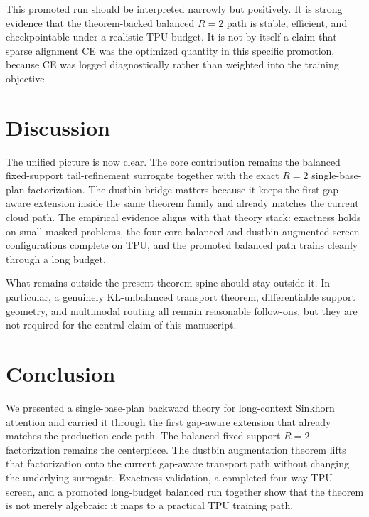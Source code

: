 \documentclass{article}
\begin{document}
This promoted run should be interpreted narrowly but positively. It is strong evidence that the theorem-backed balanced $R=2$ path is stable, efficient, and checkpointable under a realistic TPU budget. It is not by itself a claim that sparse alignment CE was the optimized quantity in this specific promotion, because CE was logged diagnostically rather than weighted into the training objective.

\section{Discussion}

The unified picture is now clear. The core contribution remains the balanced fixed-support tail-refinement surrogate together with the exact $R=2$ single-base-plan factorization. The dustbin bridge matters because it keeps the first gap-aware extension inside the same theorem family and already matches the current cloud path. The empirical evidence aligns with that theory stack: exactness holds on small masked problems, the four core balanced and dustbin-augmented screen configurations complete on TPU, and the promoted balanced path trains cleanly through a long budget.

What remains outside the present theorem spine should stay outside it. In particular, a genuinely KL-unbalanced transport theorem, differentiable support geometry, and multimodal routing all remain reasonable follow-ons, but they are not required for the central claim of this manuscript.

\section{Conclusion}

We presented a single-base-plan backward theory for long-context Sinkhorn attention and carried it through the first gap-aware extension that already matches the production code path. The balanced fixed-support $R=2$ factorization remains the centerpiece. The dustbin augmentation theorem lifts that factorization onto the current gap-aware transport path without changing the underlying surrogate. Exactness validation, a completed four-way TPU screen, and a promoted long-budget balanced run together show that the theorem is not merely algebraic: it maps to a practical TPU training path.




\newpage
\appendix
\end{document}
